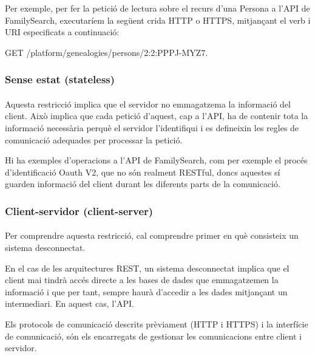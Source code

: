     Per exemple, per fer la petició de lectura sobre el recurs d’una Persona a l’\gls{API} de FamilySearch, executaríem la següent crida \gls{HTTP} o \gls{HTTPS}, mitjançant el verb i URI especificats a continuació:
    \begin{displayquote}
        GET /platform/genealogies/persons/2:2:PPPJ-MYZ7.
    \end{displayquote}


    \subsubsection{Sense estat (stateless)}

    \paragraph{}
    Aquesta restricció implica que el servidor no emmagatzema la informació del client. Això implica que cada petició d'aquest, cap a l’\gls{API}, ha de contenir tota la informació necessària perquè el servidor l'identifiqui i es defineixin les regles de comunicació adequades per processar la petició.

    Hi ha exemples d'operacions a l'\gls{API} de FamilySearch, com per exemple el procés d'identificació Oauth V2, que no són realment RESTful, doncs aquestes sí guarden informació del client durant les diferents parts de la comunicació.


    \subsubsection{Client-servidor (client-server)}

    \paragraph{}
    Per comprendre aquesta restricció, cal comprendre primer en què consisteix un sistema desconnectat.

    En el cas de les arquitectures REST, un sistema desconnectat implica que el client mai tindrà accés directe a les bases de dades que emmagatzemen la informació i que per tant, sempre haurà d'accedir a les dades mitjançant un intermediari. En aquest cas, l'\gls{API}.

    Els protocols de comunicació descrits prèviament (\gls{HTTP} i \gls{HTTPS}) i la interfície de comunicació, són els encarregats de gestionar les comunicacions entre client i servidor.


